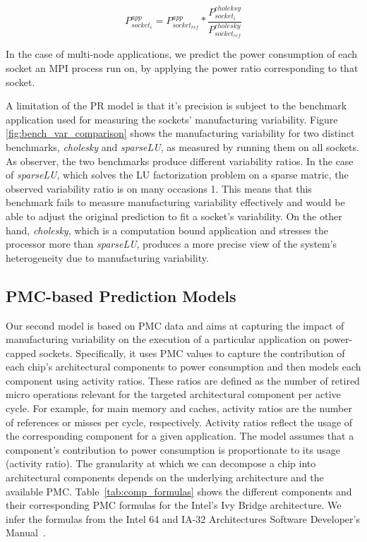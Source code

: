 \begin{equation}
\label{eq:naive_model}
P_{socket_{i}}^{app} = P_{socket_{ref}}^{app} * \frac{P_{socket_{i}}^{choleksy}}{P_{socket_{ref}}^{cholesky}}
\end{equation}

In the case of multi-node applications, we predict the power consumption of each socket an MPI process run on, by applying the power ratio corresponding to that socket.

A limitation of the PR model is that it's precision is subject to the benchmark application used
for measuring the sockets' manufacturing variability.  Figure \ref{fig:bench_var_comparison} shows
the manufacturing variability for two distinct benchmarks, \textit{cholesky} and \textit{sparseLU},
as measured by running them on all sockets.  As observer, the two benchmarks produce different
variability ratios.  In the case of \textit{sparseLU}, which solves the LU factorization problem
on a sparse matric, the observed variability ratio is on many occasions 1.  This means that this
benchmark fails to measure manufacturing variability effectively and would be able to adjust
the original prediction to fit a socket's variability.  On the other hand, \textit{cholesky},
which is a computation bound application and stresses the processor more than \textit{sparseLU},
produces a more precise view of the system's heterogeneity due to manufacturing variability.


\subsection{PMC-based Prediction Models}
\label{sec:pmcs_model}
Our second model is based on PMC data and aims at capturing the impact of manufacturing variability on the execution of a particular application on power-capped sockets. 
Specifically, it uses PMC values to capture the contribution of each chip's architectural components to power consumption and then models each component using activity ratios.
These ratios are defined as the number of retired micro operations relevant for the targeted architectural component per active cycle.  
For example, for main memory and caches, activity ratios are the number of references or misses per cycle, respectively. 
Activity ratios reflect the usage of the corresponding component for a given application.  The model assumes that a component's contribution to power consumption is proportionate
to its usage (activity ratio).
The granularity at which we can decompose a chip into architectural components depends on the underlying architecture and the available PMC.    
Table~\ref{tab:comp_formulas} shows the different components and their corresponding PMC formulas for the Intel's Ivy Bridge architecture.  
We infer the 
formulas from the Intel 64 and IA-32 Architectures Software Developer's Manual~\cite{fquesnel:progguide:intel10}.

